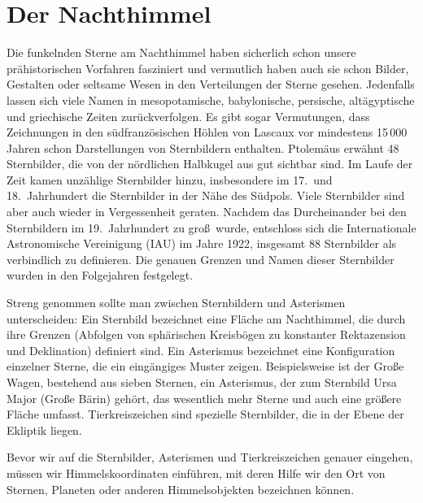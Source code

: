 
\chapter{Der Nachthimmel}
\label{chap_Nachthimmel}

Die funkelnden Sterne am Nachthimmel haben sicherlich schon unsere pr\"ahistorischen Vorfahren
fasziniert und vermutlich haben auch sie schon Bilder, Gestalten
oder seltsame Wesen in den Verteilungen der Sterne gesehen. Jedenfalls lassen sich viele
Namen in mesopotamische, babylonische, persische, alt\"agyptische und griechische
Zeiten zur\"uckverfolgen. Es gibt sogar Vermutungen, dass Zeichnungen in den
s\"udfranz\"osischen H\"ohlen von Lascaux vor mindestens 15\,000 Jahren schon Darstellungen
von Sternbildern enthalten. 
Ptolem\"aus erw\"ahnt 48 Sternbilder, die von der n\"ordlichen
Halbkugel aus gut sichtbar sind. Im Laufe der Zeit kamen unz\"ahlige Sternbilder hinzu,
insbesondere im 17.\ und 18.\ Jahrhundert die Sternbilder in der N\"ahe des S\"udpols. Viele Sternbilder
sind aber auch wieder in Vergessenheit geraten.
Nachdem das Durcheinander bei den Sternbildern im 19.\ Jahrhundert
zu gro\ss\ wurde, entschloss sich die Internationale Astronomische Vereinigung (IAU) im Jahre
1922, insgesamt 88 Sternbilder als verbindlich zu definieren. Die genauen Grenzen und
Namen dieser Sternbilder wurden in den Folgejahren festgelegt. 

Streng genommen sollte man zwischen Sternbildern und Asterismen 
unterscheiden:
Ein Sternbild bezeichnet eine Fl\"ache am Nachthimmel, die durch ihre Grenzen
(Abfolgen von sph\"arischen Kreisb\"ogen zu konstanter Rektazension und Deklination) definiert sind.
Ein Asterismus bezeichnet eine Konfiguration einzelner Sterne, die ein eing\"angiges
Muster zeigen. Beispielsweise ist der Gro\ss e Wagen, 
bestehend aus sieben Sternen,
ein Asterismus, der zum Sternbild Ursa Major (Gro\ss e B\"arin) geh\"ort, das wesentlich
mehr Sterne und auch eine gr\"o\ss ere Fl\"ache umfasst. Tierkreiszeichen sind spezielle
Sternbilder, die in der Ebene der Ekliptik liegen. 

Bevor wir auf die Sternbilder, Asterismen und Tierkreiszeichen genauer eingehen, m\"ussen
wir Himmelskoordinaten einf\"uhren, mit deren Hilfe wir den Ort von Sternen, Planeten oder anderen
Himmelsobjekten bezeichnen k\"onnen.   

